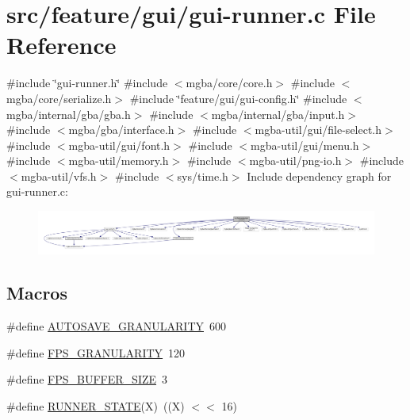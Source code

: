 \hypertarget{gui-runner_8c}{}\section{src/feature/gui/gui-\/runner.c File Reference}
\label{gui-runner_8c}
{\ttfamily \#include \char`\"{}gui-\/runner.\+h\char`\"{}}\newline
{\ttfamily \#include $<$mgba/core/core.\+h$>$}\newline
{\ttfamily \#include $<$mgba/core/serialize.\+h$>$}\newline
{\ttfamily \#include \char`\"{}feature/gui/gui-\/config.\+h\char`\"{}}\newline
{\ttfamily \#include $<$mgba/internal/gba/gba.\+h$>$}\newline
{\ttfamily \#include $<$mgba/internal/gba/input.\+h$>$}\newline
{\ttfamily \#include $<$mgba/gba/interface.\+h$>$}\newline
{\ttfamily \#include $<$mgba-\/util/gui/file-\/select.\+h$>$}\newline
{\ttfamily \#include $<$mgba-\/util/gui/font.\+h$>$}\newline
{\ttfamily \#include $<$mgba-\/util/gui/menu.\+h$>$}\newline
{\ttfamily \#include $<$mgba-\/util/memory.\+h$>$}\newline
{\ttfamily \#include $<$mgba-\/util/png-\/io.\+h$>$}\newline
{\ttfamily \#include $<$mgba-\/util/vfs.\+h$>$}\newline
{\ttfamily \#include $<$sys/time.\+h$>$}\newline
Include dependency graph for gui-\/runner.c\+:
\nopagebreak
\begin{figure}[H]
\begin{center}
\leavevmode
\includegraphics[width=350pt]{gui-runner_8c__incl}
\end{center}
\end{figure}
\subsection*{Macros}
\begin{DoxyCompactItemize}
\item 
\#define \mbox{\hyperlink{gui-runner_8c_a9257e65a77150da52aba4237ec2766c1}{A\+U\+T\+O\+S\+A\+V\+E\+\_\+\+G\+R\+A\+N\+U\+L\+A\+R\+I\+TY}}~600
\item 
\#define \mbox{\hyperlink{gui-runner_8c_a73072697452ba73d19e04e68b6181298}{F\+P\+S\+\_\+\+G\+R\+A\+N\+U\+L\+A\+R\+I\+TY}}~120
\item 
\#define \mbox{\hyperlink{gui-runner_8c_aa6b0c6cee2d1a3845fed773b77b872a1}{F\+P\+S\+\_\+\+B\+U\+F\+F\+E\+R\+\_\+\+S\+I\+ZE}}~3
\item 
\#define \mbox{\hyperlink{gui-runner_8c_ad37aed8af90f4846dcfd7bca08c5b42d}{R\+U\+N\+N\+E\+R\+\_\+\+S\+T\+A\+TE}}(X)~((X) $<$$<$ 16)
\end{DoxyCompactItemize}
